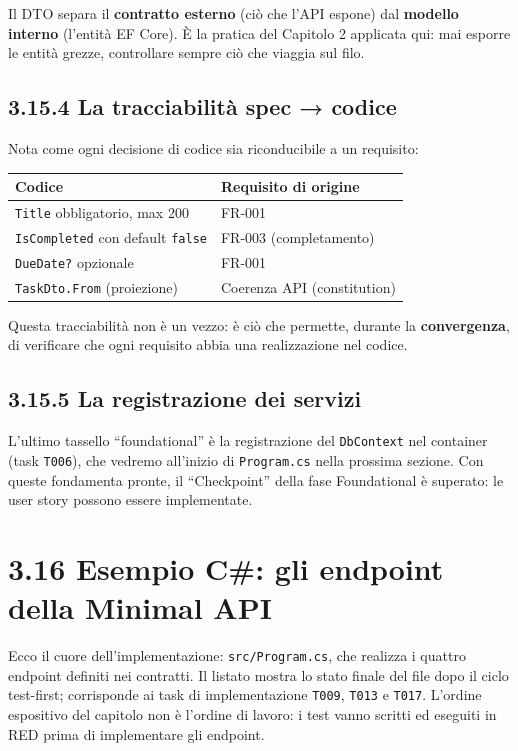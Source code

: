 \documentclass[
  italian,
  10pt,
]{book}
\newcounter{none} %
\begin{document}
Il DTO separa il \textbf{contratto esterno} (ciò che l'API espone) dal
\textbf{modello interno} (l'entità EF Core). È la pratica del Capitolo 2
applicata qui: mai esporre le entità grezze, controllare sempre ciò che
viaggia sul filo.

\subsection{3.15.4 La tracciabilità spec →
codice}\label{la-tracciabilituxe0-spec-codice}

Nota come ogni decisione di codice sia riconducibile a un requisito:

{\def\LTcaptype{none} %
\begin{longtable}[]{@{}ll@{}}
\toprule\noalign{}
Codice & Requisito di origine \\
\midrule\noalign{}
\endhead
\bottomrule\noalign{}
\endlastfoot
\texttt{Title} obbligatorio, max 200 & FR-001 \\
\texttt{IsCompleted} con default \texttt{false} & FR-003
(completamento) \\
\texttt{DueDate?} opzionale & FR-001 \\
\texttt{TaskDto.From} (proiezione) & Coerenza API (constitution) \\
\end{longtable}
}

Questa tracciabilità non è un vezzo: è ciò che permette, durante la
\textbf{convergenza}, di verificare che ogni requisito abbia una
realizzazione nel codice.

\subsection{3.15.5 La registrazione dei
servizi}\label{la-registrazione-dei-servizi}

L'ultimo tassello ``foundational'' è la registrazione del
\texttt{DbContext} nel container (task \texttt{T006}), che vedremo
all'inizio di \texttt{Program.cs} nella prossima sezione. Con queste
fondamenta pronte, il ``Checkpoint'' della fase Foundational è superato:
le user story possono essere implementate.

\section{3.16 Esempio C\#: gli endpoint della Minimal
API}\label{esempio-c-gli-endpoint-della-minimal-api}

Ecco il cuore dell'implementazione: \texttt{src/Program.cs}, che
realizza i quattro endpoint definiti nei contratti. Il listato mostra lo
stato finale del file dopo il ciclo test-first; corrisponde ai task di
implementazione \texttt{T009}, \texttt{T013} e \texttt{T017}. L'ordine
espositivo del capitolo non è l'ordine di lavoro: i test vanno scritti
ed eseguiti in RED prima di implementare gli endpoint.
\end{document}
